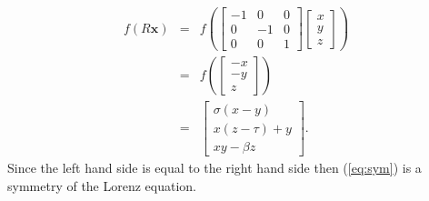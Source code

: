 \documentclass[12pt]{article}
\begin{document}
\begin{eqnarray*}
f(R\textbf{x}) & = & f(\begin{bmatrix}
-1 & 0 & 0 \\
0 & -1 & 0 \\
0 & 0 & 1 
\end{bmatrix}\begin{bmatrix}
x \\
y \\
z
\end{bmatrix})\\
& = & f(\begin{bmatrix}
-x \\
-y \\
z
\end{bmatrix})\\
& = & \begin{bmatrix}
\sigma(x-y)  \\
x(z - \tau ) + y \\
xy - \beta z
\end{bmatrix}.
\end{eqnarray*}
Since the left hand side is equal to the right hand side then (\ref{eq:sym}) is a symmetry of the Lorenz equation.
\end{document}

